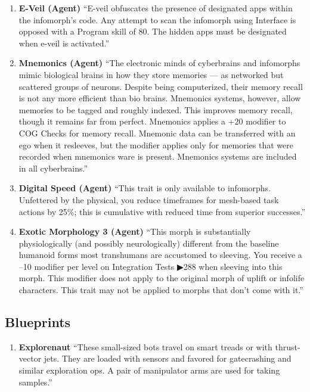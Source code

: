 \begin{enumerate}
    \item \textbf{E-Veil (Agent)} “E-veil obfuscates the presence of designated apps within the infomorph’s code. Any attempt to scan the infomorph using Interface is opposed with a Program skill of 80. The hidden apps must be designated when e-veil is activated.” \citep[pg. 326]{ep2e_1.1_2019}

    \item \textbf{Mnemonics (Agent)} “The electronic minds of cyberbrains and infomorphs mimic biological brains in how they store memories — as networked but scattered groups of neurons. Despite being computerized, their memory recall is not any more efficient than bio brains. Mnemonics systems, however, allow memories to be tagged and roughly indexed. This improves memory recall, though it remains far from perfect. Mnemonics applies a +20 modifier to COG Checks for memory recall. Mnemonic data can be transferred with an ego when it resleeves, but the modifier applies only for memories that were recorded when mnemonics ware is present. Mnemonics systems are included in all cyberbrains.” \citep[pg. 316]{ep2e_1.1_2019}

    \item \textbf{Digital Speed (Agent)} “This trait is only available to infomorphs. Unfettered by the physical, you reduce timeframes for mesh-based task actions by 25\%; this is cumulative with reduced time from superior successes.” \citep[pg. 73]{ep2e_1.1_2019}

    \item \textbf{Exotic Morphology 3 (Agent)} “This morph is substantially physiologically (and possibly neurologically) different from the baseline humanoid forms most transhumans are accustomed to sleeving. You receive a –10 modifier per level on Integration Tests ▶288 when sleeving into this morph. This modifier does not apply to the original morph of uplift or infolife characters. This trait may not be applied to morphs that don’t come with it.” \citep[pg. 78]{ep2e_1.1_2019}

\end{enumerate}


\subsection{Blueprints}

\begin{enumerate}

    \item \textbf{\gls{Explorenaut}} “These small-sized bots travel on smart treads or with thrust-vector jets. They are loaded with sensors and favored for gatecrashing and similar exploration ops. A pair of manipulator arms are used for taking samples.” \citep[pg. 347]{ep2e_1.1_2019}

\end{enumerate}


